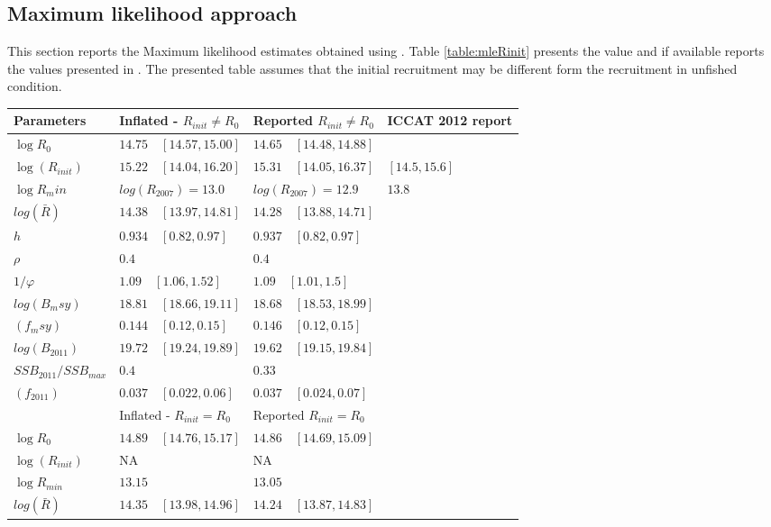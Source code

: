 \subsection{Maximum likelihood approach}
This section reports the Maximum likelihood estimates obtained using \iscam. Table \ref{table:mleRinit} presents the value and if available reports the values presented  in 
\cite{tuna2012}. The presented table assumes that the initial recruitment may be different form the recruitment in unfished condition.

\begin{table}
 \begin{tabular}{p{2.1cm}p{4cm}p{4cm}p{4cm}}
  \hline
Parameters & Inflated - $R_{init}\ne R_0$  & Reported $R_{init}\ne R_0$ & ICCAT 2012  report  \\ \hline
$\log{R_0}$ &  $14.75 \quad [14.57, 15.00]$ &  $14.65\quad[14.48, 14.88]$\\
$\log(R_{init})$ &  $15.22\quad [14.04, 16.20]$ & $15.31\quad[14.05, 16.37]$ & $[14.5, 15.6]$\\
$\log{R_min}$ &  $log(R_{2007})=13.0$ &  $log(R_{2007})=12.9$ & $13.8$\\
$log(\bar{R})$&  $14.38\quad [ 13.97,14.81]$  & $14.28\quad[13.88, 14.71]$\\
$h$  & $0.934\quad [0.82, 0.97]$  & $0.937\quad[0.82, 0.97]$\\ 
$\rho$ & $0.4$ &  $0.4$ & 	\\ 
$1/\varphi$  & $1.09\quad[1.06, 1.52]$ &$1.09\quad[1.01, 1.5]$ \\
$log(B_msy)$ &   $18.81\quad[18.66, 19.11]$ &   $18.68\quad[18.53,18.99]$\\
$(f_msy)$   &$0.144\quad [0.12, 0.15]$  & $0.146\quad[0.12, 0.15]$\\
$log(B_{2011})$   &$19.72\quad[19.24, 19.89]$   &$19.62\quad[19.15, 19.84]$\\
$SSB_{2011}/SSB_{max}$   & $0.4$   &$0.33$ \\
$(f_{2011})$ &   $0.037\quad[0.022, 0.06]$ &  $0.037\quad[0.024, 0.07]$ \\ \hline\hline
& Inflated - $R_{init} = R_0$  & Reported $R_{init}=  R_0$ &   \\ \hline
$\log{R_0}$ &  $14.89\quad [14.76, 15.17]$   & $14.86\quad [14.69, 15.09]$  \\
$\log(R_{init})$ & NA  & NA &\\
$\log{R_{min}}$ &  $13.15$ & $13.05$ & \\
$log(\bar{R})$&  $14.35\quad [13.98, 14.96]$  & $14.24\quad[13.87, 14.83]$\\

\end{tabular}
\end{table}
